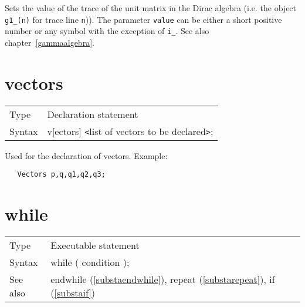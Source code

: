 \noindent Sets the value of the trace of the 
unit matrix in the Dirac 
algebra (i.e. the object \verb:g1_(n): for trace line 
\verb:n:)). The parameter \verb:value: can be either a short positive 
number or any symbol with the exception of \verb:i_:. See also 
chapter~\ref{gammaalgebra}. \vspace{10mm}


\section{vectors}
\label{substavectors}

\noindent \begin{tabular}{ll}
Type & Declaration statement\\
Syntax & v[ectors] {\tt<}list of vectors to be declared{\tt>};
\end{tabular} \vspace{4mm}

\noindent Used for the declaration of vectors. Example:
\begin{verbatim}
   Vectors p,q,q1,q2,q3;
\end{verbatim}
\vspace{10mm}


\section{while}
\label{substawhile}

\noindent \begin{tabular}{ll}
Type & Executable statement\\
Syntax & while ( condition );
\\ See also & endwhile (\ref{substaendwhile}), repeat (\ref{substarepeat}),
            if (\ref{substaif})
\end{tabular} \vspace{4mm}

